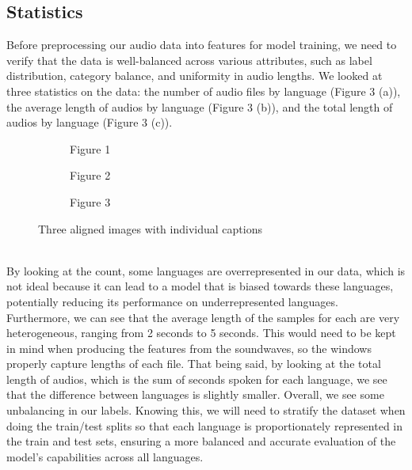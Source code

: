 \documentclass[twocolumn]{article}
\begin{document}
\subsection{Statistics}
Before preprocessing our audio data into features for model training, we need to verify that the data is well-balanced across various attributes, such as label distribution, category balance, and uniformity in audio lengths. We looked at three statistics on the data: the number of audio files by language (Figure 3 (a)), the average length of audios by language (Figure 3 (b)), and the total length of audios by language (Figure 3 (c)). 
\begin{figure}[h]
    \centering
    \begin{subfigure}[b]{0.3\textwidth}
        \centering
        
        \caption{Figure 1}
        \label{fig:image1}
    \end{subfigure}
    \hfill
    \begin{subfigure}[b]{0.3\textwidth}
        \centering
        
        \caption{Figure 2}
        \label{fig:image2}
    \end{subfigure}
    \hfill
    \begin{subfigure}[b]{0.3\textwidth}
        \centering
        
        \caption{Figure 3}
        \label{fig:image3}
    \end{subfigure}
    \caption{Three aligned images with individual captions}
    \label{fig:three_images}
\end{figure}\\
By looking at the count, some languages are overrepresented in our data, which is not ideal because it can lead to a model that is biased towards these languages, potentially reducing its performance on underrepresented languages. Furthermore, we can see that the average length of the samples for each are very heterogeneous, ranging from 2 seconds to 5 seconds. This would need to be kept in mind when producing the features from the soundwaves, so the windows properly capture lengths of each file. That being said, by looking at the total length of audios, which is the sum of seconds spoken for each language, we see that the difference between languages is slightly smaller. Overall, we see some unbalancing in our labels. Knowing this, we will need to stratify the dataset when doing the train/test splits so that each language is proportionately represented in the train and test sets, ensuring a more balanced and accurate evaluation of the model's capabilities across all languages.
\end{document}
